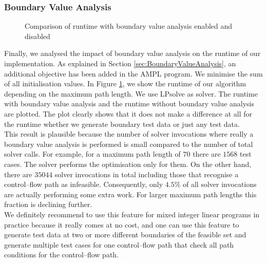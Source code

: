 \documentclass[runningheads,a4paper]{llncs}%
\begin{document}
\subsubsection{Boundary Value Analysis}
\label{sec:caseStudyBoundaryValues}
\begin{figure}
\begin{center}
%
\end{center}%
\caption{Comparison of runtime with boundary value analysis enabled and disabled}%
\label{fig:RuntimeBoundaryValue}%
\end{figure}%
Finally, we analysed the impact of boundary value analysis on the runtime of our implementation. As explained in Section \ref{sec:BoundaryValueAnalysis}, an additional objective has been added in the AMPL program. We minimise the sum of all initialisation values. In Figure \ref{fig:RuntimeBoundaryValue}, we show the runtime of our algorithm depending on the maximum path length. We use LPsolve as solver. The runtime with boundary value analysis and the runtime without boundary value analysis are plotted. The plot clearly shows that it does not make a difference at all for the runtime whether we generate boundary test data or just any test data.\\%
This result is plausible because the number of solver invocations where really a boundary value analysis is performed is small compared to the number of total solver calls. For example, for a maximum path length of $70$ there are $1568$ test cases. The solver performs the optimisation only for them. On the other hand, there are $35044$ solver invocations in total including those that recognise a control--flow path as infeasible. Consequently, only $4.5\%$ of all solver invocations are actually performing some extra work. For larger maximum path lengths this fraction is declining further.\\%
We definitely recommend to use this feature for mixed integer linear programs in practice because it really comes at no cost, and one can use this feature to generate test data at two or more different boundaries of the feasible set and generate multiple test cases for one control--flow path that check all path conditions for the control--flow path.%
\end{document}
